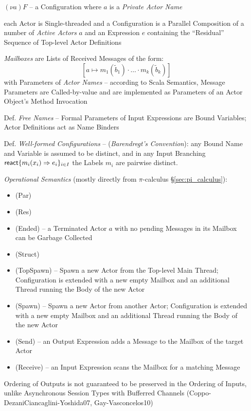 $(\nu a)F$ -- a Configuration where $a$ is a \emph{Private Actor Name}

each Actor is Single-threaded and a Configuration is a Parallel
Composition of a number of \emph{Active Actors} $a$ and an Expression
$e$ containing the ``Residual'' Sequence of Top-level Actor
Definitions

\emph{Mailboxes} are Lists of Received Messages of the form:
\[
  [a \mapsto m_1(\tilde{b}_1) \cdot\ldots\cdot m_k(\tilde{b}_k)]
\]
with Parameters of \emph{Actor Names} -- according to Scala Semantics,
Message Parameters are Called-by-value and are implemented as
Parameters of an Actor Object's Method Invocation %

Def. \emph{Free Names} -- Formal Parameters of Input Expressions are
Bound Variables; Actor Definitions act as Name Binders

Def. \emph{Well-formed Configurations} -- (\emph{Barendregt's
  Convention}): any Bound Name and Variable is assumed to be distinct,
and in any Input Branching $\mathsf{react}\{m_i(x_i) \Rightarrow e_i\}_{i \in
  I}$ the Labels $m_i$ are pairwise distinct.

\emph{Operational Semantics} (mostly directly from $\pi$-calculus
\S\ref{sec:pi_calculus}):
\begin{itemize}
  \item (Par)
  \item (Res)
  \item (Ended) -- a Terminated Actor $a$ with no pending Messages in
    its Mailbox can be Garbage Collected
  \item (Struct)
  \item (TopSpawn) -- Spawn a new Actor from the Top-level Main
    Thread; Configuration is extended with a new empty Mailbox and an
    additional Thread running the Body of the new Actor
  \item (Spawn) -- Spawn a new Actor from another Actor; Configuration
    is extended with a new empty Mailbox and an additional Thread
    running the Body of the new Actor
  \item (Send) -- an Output Expression adds a Message to the Mailbox
    of the target Actor
  \item (Receive) -- an Input Expression scans the Mailbox for a
    matching Message
\end{itemize}

Ordering of Outputs is not guaranteed to be preserved in the Ordering
of Inputs, unlike Asynchronous Session Types with Bufferred Channels
(Coppo-DezaniCiancaglini-Yoshida07, Gay-Vasconcelos10)


